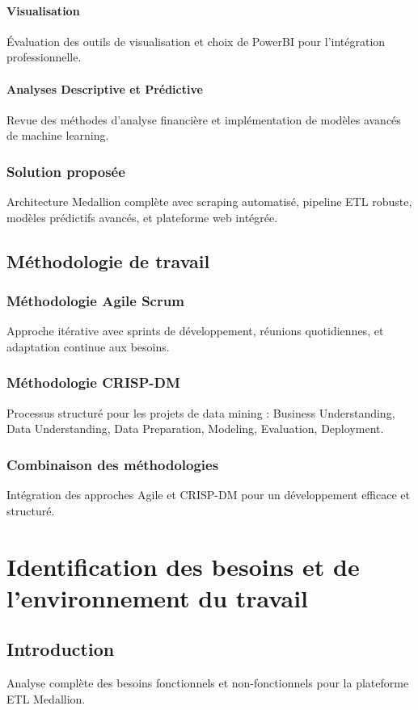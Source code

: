 \documentclass[12pt,a4paper]{article}
\begin{document}
\paragraph{Visualisation}
Évaluation des outils de visualisation et choix de PowerBI pour l'intégration professionnelle.

\paragraph{Analyses Descriptive et Prédictive}
Revue des méthodes d'analyse financière et implémentation de modèles avancés de machine learning.

\subsubsection{Solution proposée}
Architecture Medallion complète avec scraping automatisé, pipeline ETL robuste, modèles prédictifs avancés, et plateforme web intégrée.

\subsection{Méthodologie de travail}
\subsubsection{Méthodologie Agile Scrum}
Approche itérative avec sprints de développement, réunions quotidiennes, et adaptation continue aux besoins.

\subsubsection{Méthodologie CRISP-DM}
Processus structuré pour les projets de data mining : Business Understanding, Data Understanding, Data Preparation, Modeling, Evaluation, Deployment.

\subsubsection{Combinaison des méthodologies}
Intégration des approches Agile et CRISP-DM pour un développement efficace et structuré.

\section{Identification des besoins et de l'environnement du travail}

\subsection{Introduction}
Analyse complète des besoins fonctionnels et non-fonctionnels pour la plateforme ETL Medallion.
\end{document}

